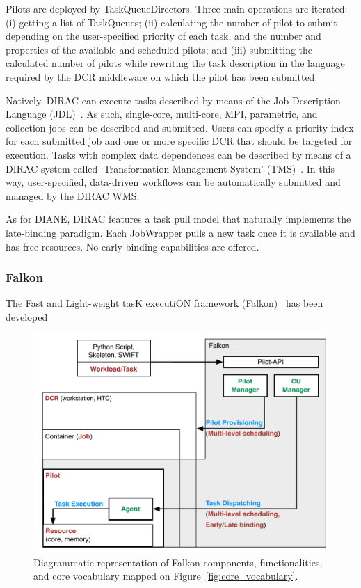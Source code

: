 \documentclass{sig-alternate}
\begin{document}
Pilots are deployed by TaskQueueDirectors. Three main operations are iterated:
(i) getting a list of TaskQueues; (ii) calculating the number of pilot to submit
depending on the user-specified priority of each task, and the number and
properties of the available and scheduled pilots; and (iii) submitting the
calculated number of pilots while rewriting the task description in the language
required by the DCR middleware on which the pilot has been submitted.

Natively, DIRAC can execute tasks described by means of the Job Description
Language (JDL)~\cite{pacini2006job}. As such, single-core, multi-core, MPI,
parametric, and collection jobs can be described and submitted. Users can
specify a priority index for each submitted job and one or more specific DCR
that should be targeted for execution. Tasks with complex data dependences can
be described by means of a DIRAC system called `Transformation Management
System' (TMS)~\cite{tsaregorodtsev2006dirac}. In this way, user-specified,
data-driven workflows can be automatically submitted and managed by the DIRAC
WMS.

As for DIANE, DIRAC features a task pull model that naturally implements the
late-binding paradigm. Each JobWrapper pulls a new task once it is available and
has free resources. No early binding capabilities are offered.

%
\subsubsection{Falkon}\label{sec:falkon}

The Fast and Light-weight tasK executiON framework
(Falkon)~\cite{raicu2007falkon} has been developed



\begin{figure}[t]
    \centering
        \includegraphics[width=.48\textwidth]{figures/falkon_comparison.pdf}
    \caption{Diagrammatic representation of Falkon components, functionalities,
    and core vocabulary mapped on Figure~\ref{fig:core_vocabulary}.}
    \label{fig:falkon_comparison}
\end{figure}
\end{document}
